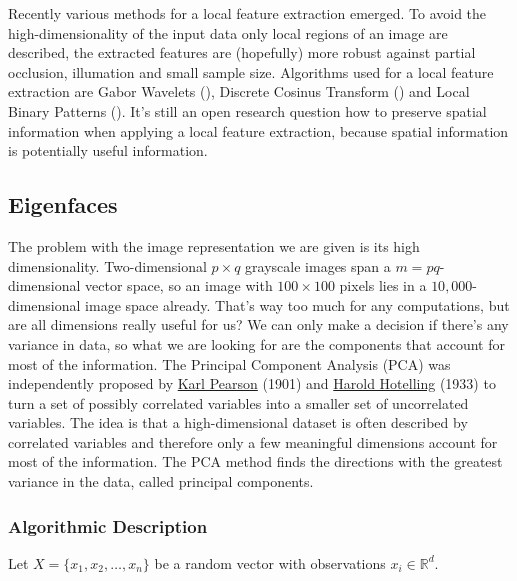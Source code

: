 Recently various methods for a local feature extraction emerged. To avoid the high-dimensionality of the input data only local regions of an image are described, the extracted features are (hopefully) more robust against partial occlusion, illumation and small sample size. Algorithms used for a local feature extraction are Gabor Wavelets (\cite{Wiskott97}), Discrete Cosinus Transform (\cite{Cardinaux2006}) and Local Binary Patterns (\cite{Ahonen04,Maturana09, Rodriguez2006}). It's still an open research question how to preserve spatial information when applying a local feature extraction, because spatial information is potentially useful information.

\subsection{Eigenfaces}

\lstset{language=matlab}

The problem with the image representation we are given is its high dimensionality. Two-dimensional $p \times q$ grayscale images span a $m = pq$-dimensional vector space, so an image with $100 \times 100$ pixels lies in a $10,000$-dimensional image space already. That's way too much for any computations, but are all dimensions really useful for us? We can only make a decision if there's any variance in data, so what we are looking for are the components that account for most of the information. The Principal Component Analysis (PCA) was independently proposed by \href{http://en.wikipedia.org/wiki/Karl_Pearson}{Karl Pearson} (1901) and \href{http://en.wikipedia.org/wiki/Harold_Hotelling}{Harold Hotelling} (1933) to turn a set of possibly correlated variables into a smaller set of uncorrelated variables. The idea is that a high-dimensional dataset is often described by correlated variables and therefore only a few meaningful dimensions account for most of the information. The PCA method finds the directions with the greatest variance in the data, called principal components.

\subsubsection{Algorithmic Description}

\label{ssection:pca_algorithm}

Let $X = \{ x_{1}, x_{2}, \ldots, x_{n} \}$ be a random vector with observations $x_i \in \mathbb{R}^{d}$.

